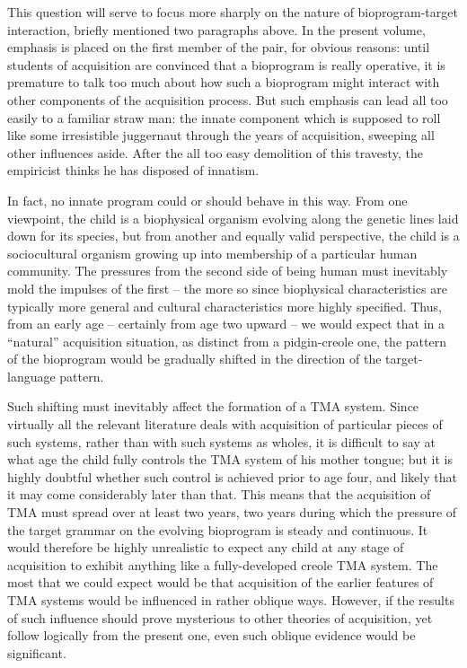 This question will serve to focus more sharply on the nature of bioprogram-target interaction, briefly mentioned two paragraphs above. In the present volume, emphasis is placed on the first member of the pair, for obvious reasons: until students of acquisition are convinced that a bioprogram is really operative, it is premature to talk too much about how such a bioprogram might interact with other components of the acquisition process. But such emphasis can lead all too easily to a familiar straw man: the innate component which is supposed to roll like some irresistible juggernaut through the years of acquisition, sweeping all other influences aside. After the all too easy demolition of this travesty, the empiricist thinks he has disposed of innatism.

In fact, no innate program could or should behave in this way. From one viewpoint, the child is a biophysical organism evolving along the genetic lines laid down for its species, but from another and equally valid perspective, the child is a sociocultural organism growing up into membership of a particular human community. The pressures from the second side of being human must inevitably mold the impulses of the first -- the more so since biophysical characteristics are typically more general and cultural characteristics more highly specified. Thus, from an early age -- certainly from age two upward -- we would expect that in a ``natural'' acquisition situation, as distinct from a pidgin-creole one, the pattern of the bioprogram would be gradually shifted in the direction of the target-language pattern.

Such shifting must inevitably affect the formation of a TMA
system. Since virtually all the relevant literature deals with acquisition of particular pieces of such systems, rather than with such systems as wholes, it is difficult to say at what age the child fully controls the TMA system of his mother tongue; but it is highly doubtful whether such control is achieved prior to age four, and likely that it may come considerably later than that. This means that the acquisition of TMA must spread over at least two years, two years during which the pressure of the target grammar on the evolving bioprogram is steady and continuous. It would therefore be highly unrealistic to expect any child at any stage of acquisition to exhibit anything like a fully-developed creole TMA system. The most that we could expect would be that acquisition of the earlier features of TMA systems would be influ\-enced in rather oblique ways. However, if the results of such influence should prove mysterious to other theories of acquisition, yet follow logically from the present one, even such oblique evidence would be significant.

